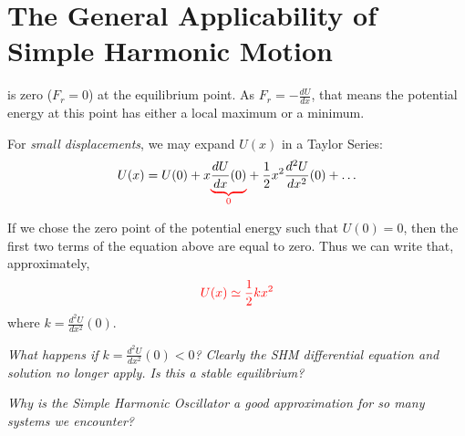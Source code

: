 \section{The General Applicability of Simple Harmonic Motion}
\vspace{-0.5cm}
 is zero ($F_r = 0$) at the equilibrium point. As $F_r = -\frac{dU}{dx}$, that means the potential energy at this point has either a local maximum or a minimum. 

For \emph{small displacements}, we may expand $U(x)$ in a Taylor Series: 
\begin{align}
U(x) = U(0) + x \textcolor{red}{\underbrace{\textcolor{black}{\frac{dU}{dx}(0)}}_{0}} + \frac{1}{2}x^2 \frac{d^2 U}{dx^2}(0) + \ldots
\end{align}

If we chose the zero point of the potential energy such that $U(0) = 0$, then the first two terms of the equation above are equal to zero. Thus we can write that, approximately,  
\begin{align}
\textcolor{red}{U(x) \simeq \frac{1}{2} kx^2}
\end{align}
where $k = \frac{d^2 U}{dx^2}(0)$. 

\noindent \emph{What happens if $k = \frac{d^2 U}{dx^2}(0) < 0$? Clearly the SHM differential equation and solution no longer apply. Is this a stable equilibrium? }

\noindent \emph{Why is the Simple Harmonic Oscillator a good approximation for so many systems we encounter?}





